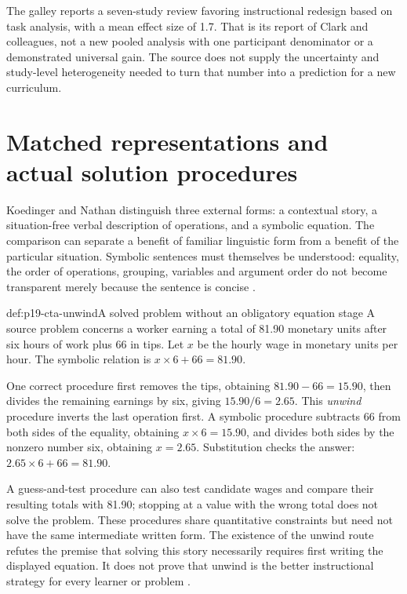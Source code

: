 The galley reports a seven-study review favoring instructional redesign
based on task analysis, with a mean effect size of 1.7. That is its
report of Clark and colleagues, not a new pooled analysis with one
participant denominator or a demonstrated universal gain. The source
does not supply the uncertainty and study-level heterogeneity needed
to turn that number into a prediction for a new curriculum.

\section{Matched representations and actual solution procedures}
\label{sec:p19-cta-representations}

Koedinger and Nathan distinguish three external forms: a contextual
story, a situation-free verbal description of operations, and a symbolic
equation. The comparison can separate a benefit of familiar linguistic
form from a benefit of the particular situation. Symbolic sentences
must themselves be understood: equality, the order of operations,
grouping, variables and argument order do not become transparent merely
because the sentence is concise
\cite[pp.~131--139]{KoedingerNathan2004StoryCTA}.

\begin{hbexample}{def:p19-cta-unwind}{A solved problem without an obligatory equation stage}
A source problem concerns a worker earning a total of 81.90 monetary
units after six hours of work plus 66 in tips. Let \(x\) be the
hourly wage in monetary units per hour. The symbolic relation is
\(x\times6+66=81.90\).

One correct procedure first removes the tips, obtaining
\(81.90-66=15.90\), then divides the remaining earnings by six,
giving \(15.90/6=2.65\). This \emph{unwind} procedure inverts the
last operation first. A symbolic procedure subtracts 66 from both sides
of the equality, obtaining \(x\times6=15.90\), and divides both
sides by the nonzero number six, obtaining \(x=2.65\).
Substitution checks the answer: \(2.65\times6+66=81.90\).

A guess-and-test procedure can also test candidate wages and compare
their resulting totals with 81.90; stopping at a value with the wrong
total does not solve the problem. These procedures share quantitative
constraints but need not have the same intermediate written form.
The existence of the unwind route refutes the premise that solving this
story necessarily requires first writing the displayed equation.
It does not prove that unwind is the better instructional strategy for
every learner or problem \cite[pp.~135,145--148]{KoedingerNathan2004StoryCTA}.
\end{hbexample}

